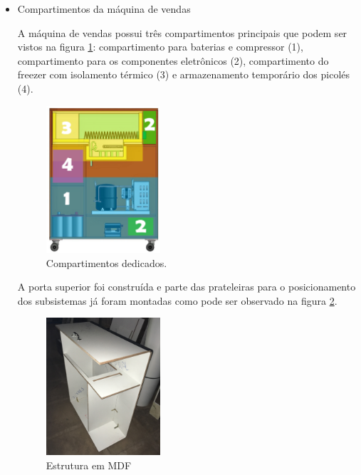 \begin{itemize}
\item Compartimentos da máquina de vendas

A máquina de vendas possui três compartimentos principais que podem ser vistos na figura \ref{fig:cad_ZONAS}: compartimento para baterias e compressor (1), compartimento para os componentes eletrônicos (2), compartimento do freezer com isolamento térmico (3) e armazenamento temporário dos picolés (4).

   \begin{figure}[H]
	\centering
    \includegraphics[width=0.4\textwidth]{figuras/cad_ZONAS}
    \caption{Compartimentos dedicados.}
    \label{fig:cad_ZONAS}
\end{figure}

A porta superior foi construída e parte das prateleiras para o posicionamento dos subsistemas já foram montadas como pode ser observado na figura \ref{fig:armario_vista_isometrica}.


   \begin{figure}[H]
	\centering
    \includegraphics[width=0.4\textwidth]{figuras/armario_vista_isometrica}
    \caption{Estrutura em MDF}
    \label{fig:armario_vista_isometrica}
\end{figure}


\end{itemize}
